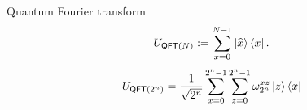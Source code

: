 \documentclass{beamer}
\newcommand\emm[1]{\textcolor{redorange}{{#1}}}
\begin{document}
\begin{frame}{Quantum Fourier transform}
\small
\vspace{-1em}
\begin{align*}
U_{\mathsf{QFT}(N)} := \sum_{x=0}^{N-1}\ket{\widehat{x}}\bra{x}.
\end{align*}
\begin{align*}
&U_{\mathsf{QFT}(2^n)} = \frac1{\sqrt{2^{n}}}\sum_{x=0}^{2^n-1}\sum_{z=0}^{2^n-1}\omega_{2^n}^{xz}\ket{z}\bra{x}\\

\end{align*}
\end{frame}
\end{document}
